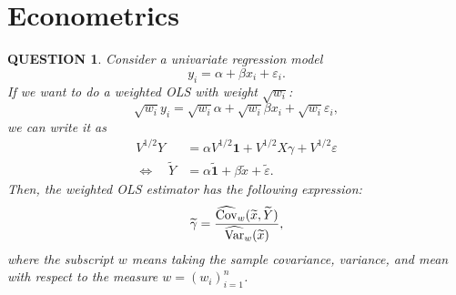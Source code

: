 \documentclass[12pt]{article}
\renewcommand{\(}{\left(}%
\renewcommand{\)}{\right)}%
\renewcommand{\[}{\left[}%
\renewcommand{\]}{\right]}%
\newcommand{\var}{{\rm Var}}
\newtheorem{question}{QUESTION}[section]}
\begin{document}
\section{Econometrics}
\begin{question}
	Consider a univariate regression model
	\begin{equation*}
		y_i=\alpha+\beta x_i+\varepsilon_i.
	\end{equation*}
	If we want to do a weighted OLS with  weight $\sqrt{w_i}$:
	\begin{equation*}
		\sqrt{w_i}y_i=\sqrt{w_i}\alpha+\sqrt{w_i}\beta x_i+\sqrt{w_i}\varepsilon_i,
	\end{equation*}
	we can write it as
	\begin{equation*}
		\begin{split}
			V^{1/2}Y&=\alpha V^{1/2}\bm{1}+ V^{1/2}X\gamma +V^{1/2}\varepsilon\\
			\Longleftrightarrow \quad \widetilde{ Y}&=\alpha\widetilde{ \bm{1}}+\beta\widetilde{ x} +\widetilde{ \varepsilon}.
		\end{split}
	\end{equation*}
	Then, the weighted OLS estimator has the following expression:
	\begin{equation*}
		\widetilde{\gamma}=\frac{\widehat{\mathrm{Cov}}_w(\widetilde{ x},\widetilde{ Y})}{\widehat{\var}_w(\widetilde{ x}) },
	\end{equation*}
	where the subscript $w$ means taking the sample covariance, variance, and mean with respect to the measure $w=(w_i)_{i=1}^n$.
\end{question}
\end{document}
